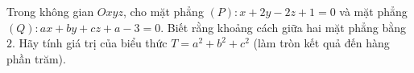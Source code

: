 \begin{ex}
Trong không gian $Oxyz$, cho mặt phẳng $(P)\colon x+2y-2z+1=0$ và mặt phẳng $(Q)\colon ax+by+cz+a-3=0$. Biết rằng khoảng cách giữa hai mặt phẳng bằng $2$. Hãy tính giá trị của biểu thức $T=a^2+b^2+c^2$ (làm tròn kết quả đến hàng phần trăm).
\end{ex}
